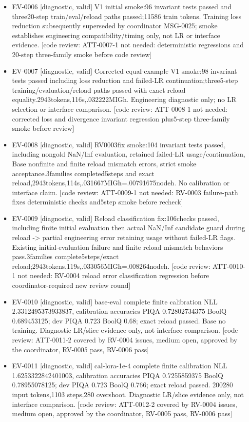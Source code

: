 \documentclass[11pt]{article}
\begin{document}
\begin{itemize}
\item EV-0006 [diagnostic, valid] V1 initial smoke:96 invariant tests passed and three20-step train/eval/reload paths passed;11586 train tokens. Training loss reduction subsequently superseded by coordinator MSG-0025; smoke establishes engineering compatibility/timing only, not LR or interface evidence. [code review: ATT-0007-1 not needed: deterministic regressions and 20-step three-family smoke before code review]
\item EV-0007 [diagnostic, valid] Corrected equal-example V1 smoke:98 invariant tests passed including loss reduction and failed-LR continuation;three5-step training/evaluation/reload paths passed with exact reload equality.2943tokens,116s,.032222MIGh. Engineering diagnostic only; no LR selection or interface comparison. [code review: ATT-0008-1 not needed: corrected loss and divergence invariant regression plus5-step three-family smoke before review]
\item EV-0008 [diagnostic, valid] RV0003fix smoke:104 invariant tests passed, including nongold NaN/Inf evaluation, retained failed-LR usage/continuation, Base nonfinite and finite reload mismatch errors, strict smoke acceptance.3families completed5steps and exact reload,2943tokens,114s,.031667MIGh=.00791675nodeh. No calibration or interface claim. [code review: ATT-0009-1 not needed: RV-0003 failure-path fixes deterministic checks and5step smoke before recheck]
\item EV-0009 [diagnostic, valid] Reload classification fix:106checks passed, including finite initial evaluation then actual NaN/Inf candidate guard during reload -\textgreater{} partial engineering error retaining usage without failed-LR flags. Existing initial-evaluation failure and finite reload mismatch behaviors pass.3families complete5steps/exact reload;2943tokens,119s,.033056MIGh=.008264nodeh. [code review: ATT-0010-1 not needed: RV-0004 reload error classification regression before coordinator-required new review round]
\item EV-0010 [diagnostic, valid] base-eval complete finite calibration NLL 2.3312495373933837, calibration accuracies PIQA 0.72802734375 BoolQ 0.689453125; dev PIQA 0.723 BoolQ 0.68; exact reload passed. Base no training. Diagnostic LR/slice evidence only, not interface comparison. [code review: ATT-0011-2 covered by RV-0004 issues, medium open, approved by the coordinator, RV-0005 pass, RV-0006 pass]
\item EV-0011 [diagnostic, valid] cal-lora-1e-4 complete finite calibration NLL 1.6253322842401003, calibration accuracies PIQA 0.7255859375 BoolQ 0.78955078125; dev PIQA 0.723 BoolQ 0.766; exact reload passed. 200280 input tokens,1103 steps,280 overshoot. Diagnostic LR/slice evidence only, not interface comparison. [code review: ATT-0012-2 covered by RV-0004 issues, medium open, approved by the coordinator, RV-0005 pass, RV-0006 pass]

\end{itemize}
\end{document}
